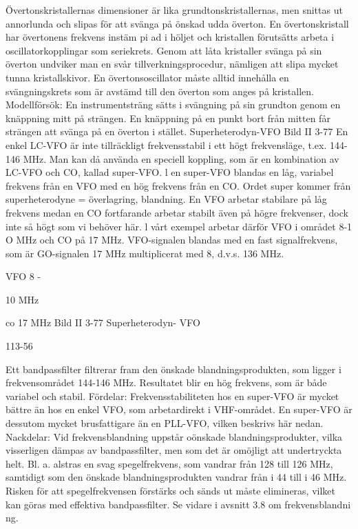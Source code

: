 \documentclass[a4paper,twoside,twocolumn,openright]{book}
\begin{document}
{{{{{{{{Övertonskristallernas dimensioner är lika
grundtonskristallernas, men snittas ut annorlunda och slipas för att svänga på önskad
udda överton. En övertonskristall har övertonens frekvens instäm pi ad i höljet och kristallen förutsätts arbeta i oscillatorkopplingar
som seriekrets. Genom att låta kristaller
svänga på sin överton undviker man en svår
tillverkningsprocedur, nämligen att slipa
mycket tunna kristallskivor.
En övertonsoscillator måste alltid innehålla en svängningskrets som är avstämd till
den överton som anges på kristallen.
Modellförsök: En instrumentsträng sätts i
svängning på sin grundton genom en knäppning mitt på strängen. En knäppning på en
punkt bort från mitten får strängen att svänga
på en överton i stället.
Superheterodyn-VFO
Bild II 3-77
En enkel LC-VFO är inte tillräckligt frekvensstabil i ett högt frekvensläge, t.ex. 144-146
MHz. Man kan då använda en speciell koppling, som är en kombination av LC-VFO och
CO, kallad super-VFO.
l en super-VFO blandas en låg, variabel
frekvens från en VFO med en hög frekvens
från en CO. Ordet super kommer från
superheterodyne = överlagring, blandning.
En VFO arbetar stabilare på låg frekvens
medan en CO fortfarande arbetar stabilt
även på högre frekvenser, dock inte så högt
som vi behöver här. l vårt exempel arbetar
därför VFO i området 8-1 O MHz och CO på
17 MHz. VFO-signalen blandas med en fast
signalfrekvens, som är GO-signalen 17 MHz
multiplicerat med 8, d.v.s. 136 MHz.

VFO 8 -

10 MHz

co 17 MHz
Bild II 3-77 Superheterodyn- VFO

113-56

Ett bandpassfilter filtrerar fram den önskade blandningsprodukten, som ligger i
frekvensområdet 144-146 MHz. Resultatet
blir en hög frekvens, som är både variabel
och stabil.
Fördelar:
Frekvensstabiliteten hos en super-VFO
är mycket bättre än hos en enkel VFO, som
arbetardirekt i VHF-området. En super-VFO
är dessutom mycket brusfattigare än en
PLL-VFO, vilken beskrivs här nedan.
Nackdelar:
Vid frekvensblandning uppstår oönskade blandningsprodukter, vilka visserligen
dämpas av bandpassfilter, men som det är
omöjligt att undertryckta helt. Bl. a. alstras en
svag spegelfrekvens, som vandrar från 128
till 126 MHz, samtidigt som den önskade
blandningsprodukten vandrar från i 44 till
i 46 MHz. Risken för att spegelfrekvensen
förstärks och sänds ut måste elimineras,
vilket kan göras med effektiva bandpassfilter. Se vidare i avsnitt 3.8 om frekvensblandni ng.

}}}}}}}}
\end{document}
